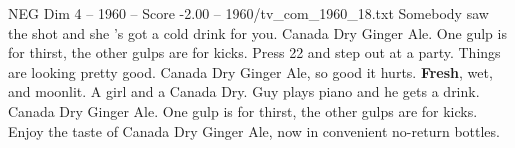\begin{textsample}{NEG Dim 4 – 1960 – Score -2.00 – 1960/tv\_com\_1960\_18.txt}  \label{ex:f4_neg_084}
Somebody saw the shot and she 's got a cold drink for you.
Canada Dry Ginger Ale.
One gulp is for thirst, the other gulps are for kicks.
Press 22 and step out at a party.
Things are looking pretty good.
Canada Dry Ginger Ale, so good it hurts. \textbf{Fresh}, wet, and moonlit.
A girl and a Canada Dry.
Guy plays piano and he gets a drink.
Canada Dry Ginger Ale.
One gulp is for thirst, the other gulps are for kicks.
Enjoy the taste of Canada Dry Ginger Ale, now in convenient no-return bottles.

\end{textsample}
